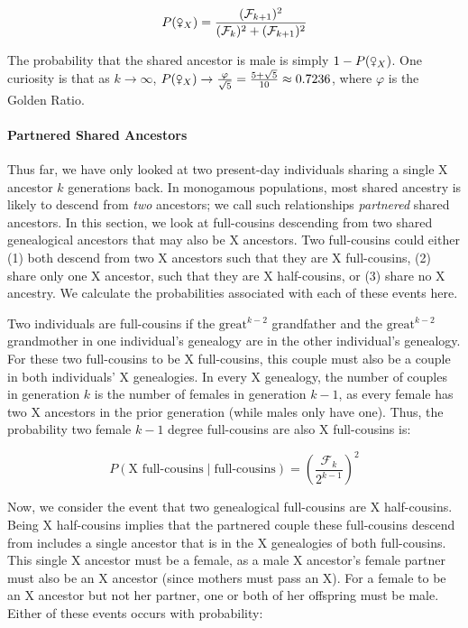 \documentclass[11pt]{article}
\newcommand{\fsxa}{\venus_X}
\begin{document}
\begin{equation}
  P(\fsxa) = \frac{(\mathcal{F}_{k+1})^2}{(\mathcal{F}_k)^2 + (\mathcal{F}_{k+1})^2}
\end{equation}

The probability that the shared ancestor is male is simply $1-P(\fsxa)$. One
curiosity is that as $k \to \infty$, $P(\fsxa) \to \frac{\varphi}{\sqrt{5}} =
\frac{5 + \sqrt{5}}{10} \approx 0.7236$, where $\varphi$ is the Golden Ratio.

\paragraph{Partnered Shared Ancestors}

Thus far, we have only looked at two present-day individuals sharing a single X
ancestor $k$ generations back. In monogamous populations, most shared ancestry
is likely to descend from \emph{two} ancestors; we call such relationships
\emph{partnered} shared ancestors. In this section, we look at full-cousins
descending from two shared genealogical ancestors that may also be X ancestors.
Two full-cousins could either (1) both descend from two X ancestors such that
they are X full-cousins, (2) share only one X ancestor, such that they are X
half-cousins, or (3) share no X ancestry. We calculate the probabilities
associated with each of these events here.

Two individuals are full-cousins if the $\text{great}^{k-2}$ grandfather and
the $\text{great}^{k-2}$ grandmother in one individual's genealogy are in the
other individual's genealogy. For these two full-cousins to be X full-cousins,
this couple must also be a couple in both individuals' X genealogies. In every
X genealogy, the number of couples in generation $k$ is the number of females
in generation $k-1$, as every female has two X ancestors in the prior
generation (while males only have one). Thus, the probability two female $k-1$
degree full-cousins are also X full-cousins is:

\begin{equation}
  P(\text{X full-cousins} \; | \; \text{full-cousins}) = 
    \left( \frac{\mathcal{F}_k}{2^{k-1}} \right)^2
\end{equation}


Now, we consider the event that two genealogical full-cousins are X
half-cousins. Being X half-cousins implies that the partnered couple these
full-cousins descend from includes a single ancestor that is in the X
genealogies of both full-cousins. This single X ancestor must be a female, as a
male X ancestor's female partner must also be an X ancestor (since mothers must
pass an X). For a female to be an X ancestor but not her partner, one or both
of her offspring must be male. Either of these events occurs with probability:
\end{document}
